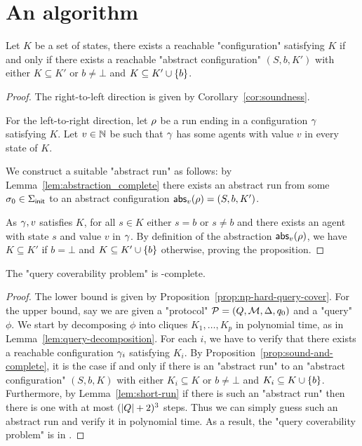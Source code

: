 \section{An \np algorithm}

\begin{proposition}
	\label{prop:sound-and-complete}
	Let $K$ be a set of states, there exists a reachable "configuration" satisfying $K$ if and only if there exists a reachable "abstract configuration" $(S,b,K')$ with either $K \subseteq K'$ or $b \neq \bot$ and $K \subseteq K' \cup \{b\}$.  
\end{proposition}

\begin{proof}
	The right-to-left direction is given by Corollary~\ref{cor:soundness}.
	
	For the left-to-right direction, let $\rho$ be a run ending in a configuration $\gamma$ satisfying $K$. Let $v \in \mathbb{N}$ be such that $\gamma$ has some agents with value $v$ in every state of $K$.
	
	We construct a suitable "abstract run" as follows: by Lemma~\ref{lem:abstraction_complete} there exists an abstract run from some $\sigma_0 \in \Sigma_{\mathsf{init}}$ to an abstract configuration $\mathsf{abs}_{v}(\rho) = (S, b, K')$.
	
	As $\gamma, v$ satisfies $K$, for all $s \in K$ either $s = b$ or $s \neq b$ and there exists an agent with state $s$ and value $v$ in $\gamma$. 	
	By definition of the abstraction $\mathsf{abs}_{v}(\rho)$, we have $K \subseteq K'$ if $b=\bot$ and $K \subseteq K' \cup \{b\}$ otherwise, proving the proposition.
\end{proof}

\begin{theorem}
	\label{thm:np-complete-query-cover}
	The "query coverability problem" is \np-complete.
\end{theorem}

\begin{proof}
	The lower bound is given by Proposition~\ref{prop:np-hard-query-cover}.
	For the upper bound, say we are given a "protocol" $\mathcal{P} = (Q, \mathcal{M}, \Delta, q_0)$ and a "query" $\phi$.
	We start by decomposing $\phi$ into cliques $K_1, \ldots, K_p$ in polynomial time, as in Lemma~\ref{lem:query-decomposition}.
	For each $i$, we have to verify that there exists a reachable configuration $\gamma_i$ satisfying $K_i$. By Proposition~\ref{prop:sound-and-complete}, it is the case if and only if there is an "abstract run" to an "abstract configuration" $(S,b, K)$ with either $K_i \subseteq K$ or $b\neq \bot$ and $K_i \subseteq K\cup\{b\}$.
	Furthermore, by Lemma~\ref{lem:short-run} if there is such an "abstract run" then there is one with at most $(|Q|+2)^3$ steps. 
	Thus we can simply guess such an abstract run and verify it in polynomial time.
	As a result, the "query coverability problem" is in \np. 
\end{proof}